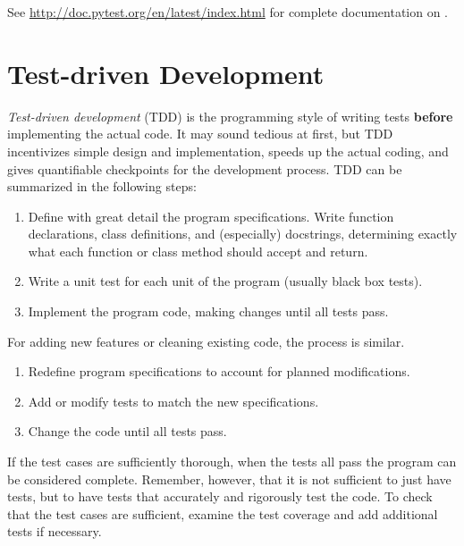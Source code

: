 See \url{http://doc.pytest.org/en/latest/index.html} for complete documentation on .

\section*{Test-driven Development} %

\emph{Test-driven development} (TDD) is the programming style of writing tests \textbf{before} implementing the actual code.
It may sound tedious at first, but TDD incentivizes simple design and implementation, speeds up the actual coding, and gives quantifiable checkpoints for the development process.
TDD can be summarized in the following steps:
\begin{enumerate}
\item Define with great detail the program specifications.
Write function declarations, class definitions, and (especially) docstrings, determining exactly what each function or class method should accept and return.
\item Write a unit test for each unit of the program (usually black box tests).
\item Implement the program code, making changes until all tests pass.
\end{enumerate}
For adding new features or cleaning existing code, the process is similar.
\begin{enumerate}
\item Redefine program specifications to account for planned modifications.
\item Add or modify tests to match the new specifications.
\item Change the code until all tests pass.
\end{enumerate}

\begin{center}
\end{center}

If the test cases are sufficiently thorough, when the tests all pass the program can be considered complete.
Remember, however, that it is not sufficient to just have tests, but to have tests that accurately and rigorously test the code.
To check that the test cases are sufficient, examine the test coverage and add additional tests if necessary.

